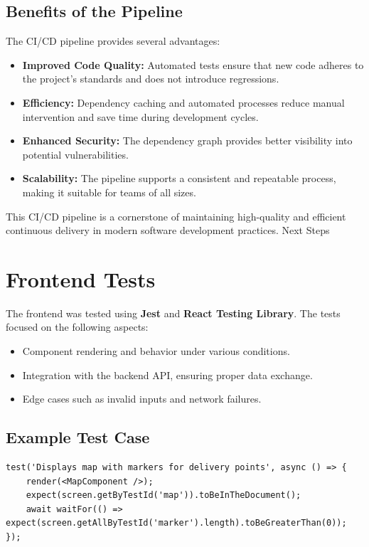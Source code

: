\documentclass[a4paper]{article}
\begin{document}
    
\subsection{Benefits of the Pipeline}

The CI/CD pipeline provides several advantages:
\begin{itemize}
    \item \textbf{Improved Code Quality:} Automated tests ensure that new code adheres to the project's standards and does not introduce regressions.
    \item \textbf{Efficiency:} Dependency caching and automated processes reduce manual intervention and save time during development cycles.
    \item \textbf{Enhanced Security:} The dependency graph provides better visibility into potential vulnerabilities.
    \item \textbf{Scalability:} The pipeline supports a consistent and repeatable process, making it suitable for teams of all sizes.
\end{itemize}
This CI/CD pipeline is a cornerstone of maintaining high-quality and efficient continuous delivery in modern software development practices.
Next Steps


\section{Frontend Tests}

The frontend was tested using \textbf{Jest} and \textbf{React Testing Library}. The tests focused on the following aspects:
\begin{itemize}
    \item Component rendering and behavior under various conditions.
    \item Integration with the backend API, ensuring proper data exchange.
    \item Edge cases such as invalid inputs and network failures.
\end{itemize}

\subsection{Example Test Case}
\begin{verbatim}
test('Displays map with markers for delivery points', async () => {
    render(<MapComponent />);
    expect(screen.getByTestId('map')).toBeInTheDocument();
    await waitFor(() => expect(screen.getAllByTestId('marker').length).toBeGreaterThan(0));
});
\end{verbatim}

\end{document}
